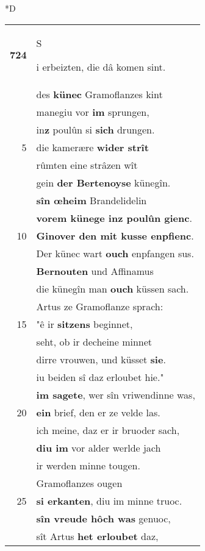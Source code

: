 \documentclass[8pt,a4paper,notitlepage]{article}
\begin{document}
\begin{table}[ht]
\begin{minipage}[t]{0.5\linewidth}
\small
\begin{center}*D
\end{center}
\begin{tabular}{rl}
\textbf{724} & \begin{large}S\end{large}i erbeizten, die dâ komen sint.\\ 
 & des \textbf{künec} Gramoflanzes kint\\ 
 & manegiu vor \textbf{im} sprungen,\\ 
 & in\textbf{z} poulûn si \textbf{sich} drungen.\\ 
5 & die kamerære \textbf{wider strît}\\ 
 & rûmten eine strâzen wît\\ 
 & gein \textbf{der Bertenoyse} künegîn.\\ 
 & \textbf{sîn œheim} Brandelidelin\\ 
 & \textbf{vorem künege inz poulûn gienc}.\\ 
10 & \textbf{Ginover den mit kusse enpfienc}.\\ 
 & Der künec wart \textbf{ouch} enpfangen sus.\\ 
 & \textbf{Bernouten} und Affinamus\\ 
 & die künegîn man \textbf{ouch} küssen sach.\\ 
 & Artus ze Gramoflanze sprach:\\ 
15 & "ê ir \textbf{sitzens} beginnet,\\ 
 & seht, ob ir decheine minnet\\ 
 & dirre vrouwen, und küsset \textbf{sie}.\\ 
 & iu beiden sî daz erloubet hie."\\ 
 & \textbf{im sagete}, wer sîn vriwendinne was,\\ 
20 & \textbf{ein} brief, den er ze velde las.\\ 
 & ich meine, daz er ir bruoder sach,\\ 
 & \textbf{diu im} vor alder werlde jach\\ 
 & ir werden minne tougen.\\ 
 & Gramoflanzes ougen\\ 
25 & \textbf{si erkanten}, diu im minne truoc.\\ 
 & \textbf{sîn vreude hôch was} genuoc,\\ 
 & sît Artus \textbf{het erloubet} daz,\\ 

\end{tabular}
\end{minipage}
\end{table}
\end{document}
